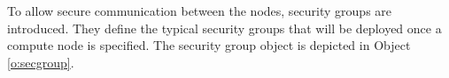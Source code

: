\documentclass[10pt]{article}
\begin{document}
To allow secure communication between the nodes, security groups are
introduced. They define the typical security groups that will be
deployed once a compute node is specified. The security group object
is depicted in Object \ref{o:secgroup}.




%
%
%










\end{document}
